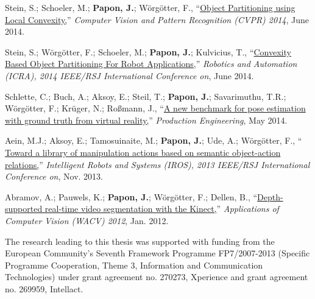 \hangindent=1.5cm Stein, S.; Schoeler, M.; \textbf{Papon, J.};  Wörgötter, F., ``\href{http://www.cv-foundation.org/openaccess/content_cvpr_2014/html/Stein_Object_Partitioning_using_2014_CVPR_paper.html}{Object Partitioning using Local Convexity,}'' \emph{Computer Vision and Pattern Recognition (CVPR) 2014}, June 2014. \\
\vspace{6pt}

\hangindent=1.5cm Stein, S.;  Wörgötter, F.; Schoeler, M.; \textbf{Papon, J.}; Kulvicius, T., ``\href{http://www.dpi.physik.uni-goettingen.de/cns/modules/BibtexModule/uploads/PDF/steinwoergoetterschoeler2014.pdf}{Convexity Based Object Partitioning For Robot Applications,}'' \emph{Robotics and Automation (ICRA), 2014 IEEE/RSJ International Conference on}, June 2014. \\
\vspace{6pt}

\hangindent=1.5cm Schlette, C.; Buch, A.; Aksoy, E.; Steil, T.; \textbf{Papon, J.}; Savarimuthu, T.R.; Wörgötter, F.; Krüger, N.; Roßmann, J., ``\href{http://link.springer.com/article/10.1007/s11740-014-0552-0}{A new benchmark for pose estimation with ground truth from virtual reality,}'' \emph{Production Engineering}, May 2014. \\
\vspace{6pt}

\hangindent=1.5cm Aein, M.J.;  Aksoy, E.; Tamosuinaite, M.; \textbf{Papon, J.}; Ude, A.; Wörgötter, F., ``\href{http://ieeexplore.ieee.org/xpls/abs_all.jsp?arnumber=6697011&tag=1}{
Toward a library of manipulation actions based on semantic object-action relations,}'' \emph{Intelligent Robots and Systems (IROS), 2013 IEEE/RSJ International Conference on}, Nov. 2013.\\
\vspace{6pt}

\hangindent=1.5cm Abramov, A.; Pauwels, K.; \textbf{Papon, J.}; Wörgötter, F.; Dellen, B., ``\href{http://dx.doi.org/10.1109/WACV.2012.6163000}{Depth-supported real-time video segmentation with the Kinect,}'' \emph{Applications of Computer Vision (WACV) 2012}, Jan. 2012.\\
\vspace{100pt}

The research leading to this thesis was supported with funding from the European Community's Seventh Framework Programme FP7/2007-2013 (Specific Programme Cooperation, Theme 3, Information and Communication Technologies) under grant agreement no. 270273, Xperience and grant agreement no. 269959, Intellact.

 
